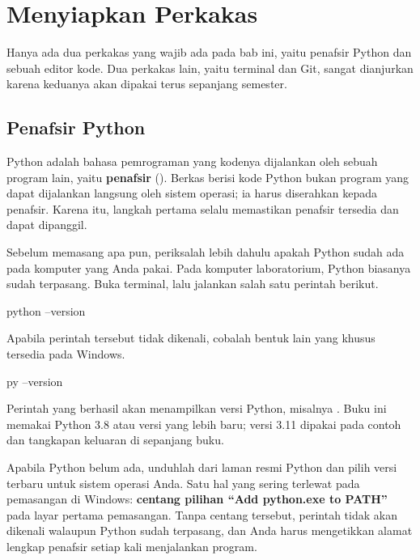 \section{Menyiapkan Perkakas}
\label{sec:menyiapkan-perkakas}

Hanya ada dua perkakas yang wajib ada pada bab ini, yaitu penafsir Python dan
sebuah editor kode. Dua perkakas lain, yaitu terminal dan Git, sangat
dianjurkan karena keduanya akan dipakai terus sepanjang semester.

\subsection{Penafsir Python}

Python adalah bahasa pemrograman yang kodenya dijalankan oleh sebuah program
lain, yaitu \textbf{penafsir} (). Berkas berisi kode
Python bukan program yang dapat dijalankan langsung oleh sistem operasi; ia
harus diserahkan kepada penafsir. Karena itu, langkah pertama selalu
memastikan penafsir tersedia dan dapat dipanggil.

Sebelum memasang apa pun, periksalah lebih dahulu apakah Python sudah ada pada
komputer yang Anda pakai. Pada komputer laboratorium, Python biasanya sudah
terpasang. Buka terminal, lalu jalankan salah satu perintah berikut.

\begin{kodekeluaran}
python --version
\end{kodekeluaran}

Apabila perintah tersebut tidak dikenali, cobalah bentuk lain yang khusus
tersedia pada Windows.

\begin{kodekeluaran}
py --version
\end{kodekeluaran}

Perintah yang berhasil akan menampilkan versi Python, misalnya
. Buku ini memakai Python 3.8 atau versi yang lebih baru;
versi 3.11 dipakai pada contoh dan tangkapan keluaran di sepanjang buku.

Apabila Python belum ada, unduhlah dari laman resmi Python dan pilih versi
terbaru untuk sistem operasi Anda. Satu hal yang sering terlewat pada
pemasangan di Windows: \textbf{centang pilihan ``Add python.exe to PATH''}
pada layar pertama pemasangan. Tanpa centang tersebut, perintah
 tidak akan dikenali walaupun Python sudah terpasang, dan Anda
harus mengetikkan alamat lengkap penafsir setiap kali menjalankan program.

